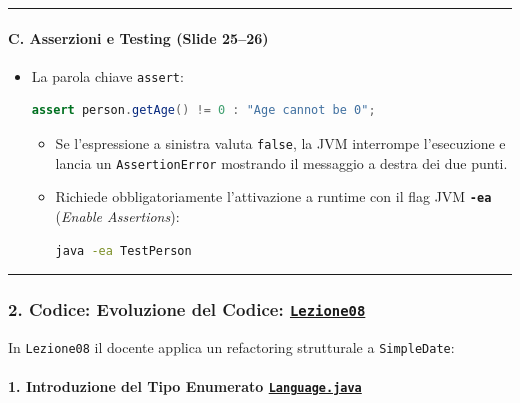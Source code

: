 \documentclass[11pt,a4paper]{article}
\newcommand{\passthrough}[1]{#1}
\begin{document}
\begin{center}\rule{0.5\linewidth}{0.5pt}\end{center}

\paragraph{C. Asserzioni e Testing (Slide
25--26)}\label{c.-asserzioni-e-testing-slide-2526}

\begin{itemize}
\item
  La parola chiave \passthrough{\lstinline!assert!}:

\begin{lstlisting}[language=Java]
assert person.getAge() != 0 : "Age cannot be 0";
\end{lstlisting}

  \begin{itemize}
  \item
    Se l'espressione a sinistra valuta \passthrough{\lstinline!false!},
    la JVM interrompe l'esecuzione e lancia un
    \passthrough{\lstinline!AssertionError!} mostrando il messaggio a
    destra dei due punti.
  \item
    Richiede obbligatoriamente l'attivazione a runtime con il flag JVM
    \textbf{\passthrough{\lstinline!-ea!}} (\emph{Enable Assertions}):

\begin{lstlisting}[language=bash]
java -ea TestPerson
\end{lstlisting}
  \end{itemize}
\end{itemize}

\begin{center}\rule{0.5\linewidth}{0.5pt}\end{center}

\subsubsection{\texorpdfstring{2. Codice: Evoluzione del Codice:
\href{file:///home/wally/Documenti/GitHub/Programmazione-II/25-26/Teoria-e-Esercitazioni/Codice-20260902/Lezione08/SimpleDate/src}{\texttt{Lezione08}}}{2. Codice: Evoluzione del Codice: Lezione08}}\label{codice-evoluzione-del-codice-lezione08}

In \passthrough{\lstinline!Lezione08!} il docente applica un refactoring
strutturale a \passthrough{\lstinline!SimpleDate!}:

\paragraph{\texorpdfstring{1. Introduzione del Tipo Enumerato
\href{file:///home/wally/Documenti/GitHub/Programmazione-II/25-26/Teoria-e-Esercitazioni/Codice-20260902/Lezione08/SimpleDate/src/Language.java}{\texttt{Language.java}}}{1. Introduzione del Tipo Enumerato Language.java}}\label{introduzione-del-tipo-enumerato-language.java}
\end{document}
